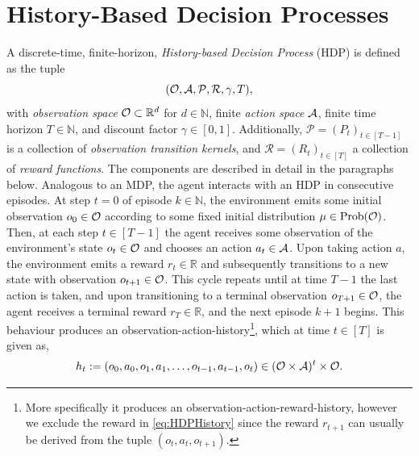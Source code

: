 \documentclass[
    a4paper,
    11pt,
    bibliography=totoc,
    listof=totoc,      
    headinclude=true,
    cleardoublepage=empty,
]{scrbook}
\theoremstyle{plain}
\theoremstyle{definition}
\theoremstyle{remark}
\newcommand{\SetR}{\mathbb R}
\newcommand{\SetN}{\mathbb N}
\newcommand{\SpaceA}{{\cal A}}
\newcommand{\SpaceO}{{\cal O}}
\begin{document}
\section{History-Based Decision Processes}
\label{chapter:HistoryRLEnvironment:section:HDP}
A discrete-time, finite-horizon, \textit{History-based Decision Process} (HDP) 
is defined as the tuple
\begin{equation}
\label{eq:HDPTuple}
    (\SpaceO, \SpaceA, \mathcal{P}, \mathcal{R}, \gamma, T),    
\end{equation}
with \textit{observation space} $\SpaceO\subset\SetR^d$ for $d\in\SetN$, 
finite \textit{action space} $\SpaceA$, finite time horizon $T\in\SetN$, and 
discount factor $\gamma\in[0,1]$. Additionally, $\mathcal{P} =
(P_t)_{t\in[T-1]}$ is a collection of \textit{observation transition kernels}, 
and $\mathcal{R}=(R_t)_{t\in[T]}$ a collection of \textit{reward functions}.
The components are described in detail in the paragraphs below.
Analogous to an MDP, the agent interacts with an HDP in 
consecutive episodes. At step $t=0$ of episode $k\in\SetN$, the environment
emits some initial observation $o_0\in\SpaceO$ according to some fixed initial
distribution $\mu\in\text{Prob}(\SpaceO)$. Then, at each step $t\in[T-1]$ the
agent receives some observation of the environment's state $o_t\in\SpaceO$ and
chooses an action $a_t\in\SpaceA$. Upon taking action $a$, the environment
emits a reward  $r_{t}\in\SetR$ and subsequently transitions to a new state
with observation $o_{t+1}\in\SpaceO$. This cycle repeats until at time
$T-1$ the last action is taken, and upon transitioning to a 
terminal observation $o_{T+1}\in\SpaceO$, the agent receives a terminal reward 
$r_T\in\SetR$, and the next episode $k+1$ begins.
This behaviour produces an observation-action-history\footnote{
    More specifically it produces an observation-action-reward-history, however
    we exclude the reward in \eqref{eq:HDPHistory} since the reward $r_{t+1}$ can
    usually be derived from the tuple $(o_t,a_t,o_{t+1})$.
}, which at time $t\in [T]$ is given as,
\begin{equation}
    \label{eq:HDPHistory}
    h_t := (o_0, a_0, o_1, a_1, \dots, o_{t-1}, a_{t-1}, o_t) 
        \in (\SpaceO \times \SpaceA)^{t} \times \SpaceO.
\end{equation}

\end{document}
